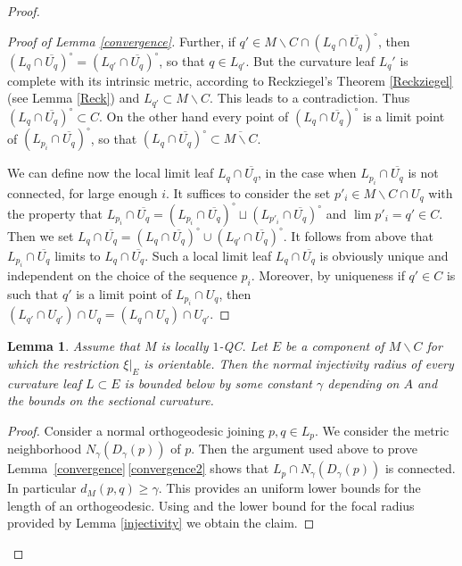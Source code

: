 \documentclass[JEP,XML,SOM,Unicode]{cedram}
\let\moins\smallsetminus
\newtheorem{lemma}[theorem]{Lemma}
\theoremstyle{definition}
\theoremstyle{remark}
\numberwithin{equation}{section}
\begin{document}
\begin{proof}
\begin{proof}[Proof of Lemma \ref{convergence}]
Further, if $q'\in M\moins C \cap (L_q\cap \overline{U_q})^{\circ}$, then $(L_q\cap \overline{U_q})^{\circ}=(L_{q'}\cap \overline{U_q})^{\circ}$, so that
$q\in L_{q'}$. But the curvature leaf $L_q'$ is complete with its intrinsic metric, according to Reckziegel's Theorem \ref{Reckziegel} (see Lemma \ref{Reck}) and $L_{q'}\subset M\moins C$. This leads to a contradiction. Thus $(L_q\cap \overline{U_q})^{\circ}\subset C$. On the other hand every point of $(L_q\cap \overline{U_q})^{\circ}$ is a limit point of $(L_{p_i}\cap \overline{U_q})^{\circ}$, so that $(L_q\cap \overline{U_q})^{\circ}\subset \overline{M\moins C}$.

We can define now the local limit leaf $L_q\cap \overline{U_q}$, in the case when $L_{p_i}\cap \overline{U_q}$ is not connected, for large enough $i$.
It suffices to consider the set $p'_i\in M\moins C\cap U_q$ with the property that
$L_{p_i}\cap \overline{U_q}=(L_{p_i}\cap \overline{U_q})^{\circ} \sqcup (L_{p'_i}\cap \overline{U_q})^{\circ}$ and
$\lim p'_i=q'\in C$. Then we set $L_q\cap \overline{U_q}= (L_q\cap \overline{U_q})^{\circ} \cup (L_{q'}\cap \overline{U_q})^{\circ}$.
It follows from above that $L_{p_i}\cap \overline{U_q}$ limits to $L_q\cap \overline{U_q}$.
Such a local limit leaf $L_q\cap \overline{U_q}$ is obviously unique and independent on the choice of the sequence $p_i$.
Moreover, by uniqueness if $q'\in C$ is such that $q'$ is a limit point of $L_{p_i}\cap U_q$, then
$(L_{q'}\cap U_{q'})\cap U_q=(L_{q}\cap U_q)\cap U_{q'}$.
\end{proof}

\begin{lemma}\label{normalinjectivity}
Assume that $M$ is locally $1$-QC. Let $E$ be a component of $M\moins C$ for which the restriction
$\xi|_{E}$ is orientable. Then the normal injectivity radius of every curvature leaf $L\subset E$ is bounded below
by some constant $\gamma$ depending on $A$ and the bounds on the sectional curvature.
\end{lemma}
\begin{proof}
Consider a normal orthogeodesic joining $p,q\in L_p$. We consider the metric neighborhood $N_{\gamma}(D_\gamma(p))$ of $p$.
Then the argument used above to prove Lemma~\ref{convergence}\,\eqref{convergence2} shows that $L_p\cap N_{\gamma}(D_\gamma(p))$ is connected.
In particular $d_M(p,q) \geq \gamma$. This provides an uniform lower bounds for the length of an orthogeodesic. Using
\cite[Th.\,4.2]{Herm} and the lower bound for the focal radius provided by Lemma \ref{injectivity} we obtain the claim.
\end{proof}


\end{proof}
\end{document}
